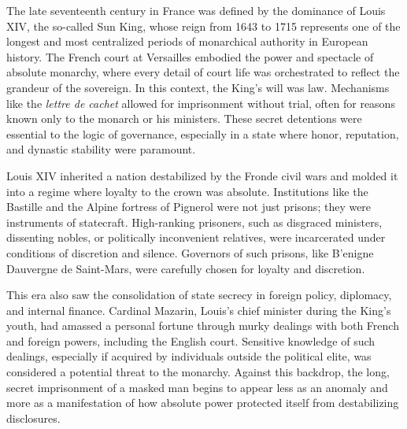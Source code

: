 \begin{historical}
The late seventeenth century in France was defined by the dominance of Louis XIV, the so-called Sun King, whose reign from 1643 to 1715 represents one of the longest and most centralized periods of monarchical authority in European history. The French court at Versailles embodied the power and spectacle of absolute monarchy, where every detail of court life was orchestrated to reflect the grandeur of the sovereign. In this context, the King's will was law. Mechanisms like the \textit{lettre de cachet} allowed for imprisonment without trial, often for reasons known only to the monarch or his ministers. These secret detentions were essential to the logic of governance, especially in a state where honor, reputation, and dynastic stability were paramount.

Louis XIV inherited a nation destabilized by the Fronde civil wars and molded it into a regime where loyalty to the crown was absolute. Institutions like the Bastille and the Alpine fortress of Pignerol were not just prisons; they were instruments of statecraft. High-ranking prisoners, such as disgraced ministers, dissenting nobles, or politically inconvenient relatives, were incarcerated under conditions of discretion and silence. Governors of such prisons, like B'enigne Dauvergne de Saint-Mars, were carefully chosen for loyalty and discretion.

This era also saw the consolidation of state secrecy in foreign policy, diplomacy, and internal finance. Cardinal Mazarin, Louis's chief minister during the King's youth, had amassed a personal fortune through murky dealings with both French and foreign powers, including the English court. Sensitive knowledge of such dealings, especially if acquired by individuals outside the political elite, was considered a potential threat to the monarchy. Against this backdrop, the long, secret imprisonment of a masked man begins to appear less as an anomaly and more as a manifestation of how absolute power protected itself from destabilizing disclosures.
\end{historical}